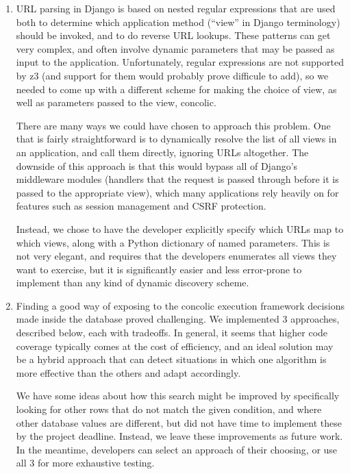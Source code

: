 \documentclass{scrartcl}
\begin{document}
\begin{enumerate}
\item URL parsing in Django is based on nested regular expressions that
  are used both to determine which application method (``view''
  in Django terminology) should be invoked, and to do reverse URL
  lookups. These patterns can get very complex, and often involve
  dynamic parameters that may be passed as input to the
  application. Unfortunately, regular expressions are not
  supported by z3 (and support for them would probably prove
  difficule to add), so we needed to come up with a different
  scheme for making the choice of view, as well as parameters
  passed to the view, concolic.

  There are many ways we could have chosen to approach this
  problem. One that is fairly straightforward is to dynamically
  resolve the list of all views in an application, and call them
  directly, ignoring URLs altogether.  The downside of this
  approach is that this would bypass all of Django's middleware
  modules (handlers that the request is passed through before it
  is passed to the appropriate view), which many applications
  rely heavily on for features such as session management and
  CSRF protection.

  Instead, we chose to have the developer explicitly specify
  which URLs map to which views, along with a Python dictionary
  of named parameters. This is not very elegant, and requires
  that the developers enumerates all views they want to exercise,
  but it is significantly easier and less error-prone to
  implement than any kind of dynamic discovery scheme.

\item Finding a good way of exposing to the concolic execution framework
  decisions made inside the database proved challenging. We implemented 3
  approaches, described below, each with tradeoffs. In general, it seems
  that higher code coverage typically comes at the cost of efficiency, and an
  ideal solution may be a hybrid approach that can detect situations in which
  one algorithm is more effective than the others and adapt accordingly.

  We have some ideas about how this search might be improved by
  specifically looking for other rows that do not match the given
  condition, and where other database values are different, but
  did not have time to implement these by the project deadline.
  Instead, we leave these improvements as future work. In the
  meantime, developers can select an approach of their choosing, or use all 3
  for more exhaustive testing.


\end{enumerate}
\end{document}

